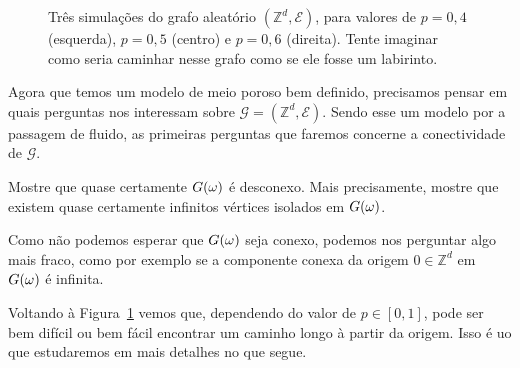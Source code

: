\begin{topics}
\begin{figure}[!ht]
  \centering
  \caption{Três simulações do grafo aleatório $(\mathbb{Z}^d, \mathcal{E})$, para valores de $p = 0,4$ (esquerda), $p = 0,5$ (centro) e $p = 0,6$ (direita). Tente imaginar como seria caminhar nesse grafo como se ele fosse um labirinto.}
  \label{f:percola}
\end{figure}

Agora que temos um modelo de meio poroso bem definido, precisamos pensar em quais perguntas nos interessam sobre $\mathcal{G} = (\mathbb{Z}^d, \mathcal{E})$.
Sendo esse um modelo por a passagem de fluido, as primeiras perguntas que faremos concerne a conectividade de $\mathcal{G}$.

\begin{exercise}
  Mostre que quase certamente $G(\omega)$ é desconexo.
  Mais precisamente, mostre que existem quase certamente infinitos vértices isolados em $G(\omega)$.
\end{exercise}

Como não podemos esperar que $G(\omega)$ seja conexo, podemos nos perguntar algo mais fraco, como por exemplo se a
componente conexa da origem $0 \in \mathbb{Z}^d$ em $G(\omega)$ é infinita.

Voltando à Figura~\ref{f:percola} vemos que, dependendo do valor de $p \in [0,1]$, pode ser bem difícil ou bem fácil encontrar um caminho longo à partir da origem.
Isso é uo que estudaremos em mais detalhes no que segue.


\end{topics}
